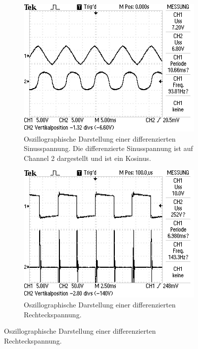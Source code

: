 \begin{figure}
    \centering
    \begin{subfigure}[b]{0.45\textwidth}
        \centering
        \includegraphics[width=\textwidth]{data_of_others_cuz_ours_suck/diff/diff_sin.JPG}
        \caption{Oszillographische Darstellung einer differenzierten Sinusspannung.
        Die differenzierte Sinusspannung ist auf Channel 2 dargestellt und ist ein Kosinus.}
        \label{fig:diff_sin}
    \end{subfigure}
    \hfill
    \begin{subfigure}[b]{0.45\textwidth}
        \centering
        \includegraphics[width=\textwidth]{data_of_others_cuz_ours_suck/diff/diff_recht.JPG}
        \caption{Oszillographische Darstellung einer differenzierten Rechteckspannung.
}
\end{subfigure}
\end{figure}
